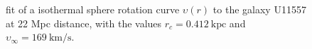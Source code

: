 \documentclass[a4paper,12pt]{article}
\begin{document}
\begin{enumerate}
\begin{figure}[h]
\begin{center}
\caption{fit of a isothermal sphere rotation curve $\upsilon(r)$ to the galaxy U11557 at 22 Mpc distance, with the values $r_c=0.412~\mathrm{kpc}$ and $\upsilon_\infty = 169~\mathrm{km}/\mathrm{s}$.}
\end{center}
\end{figure}


\end{enumerate}
\end{document}
